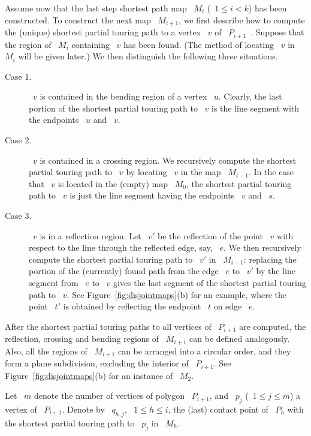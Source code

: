 \documentclass[11pt]{article}
\begin{document}
Assume now that the last step shortest path map ~\(M_i\) (~\(1 \le i < k\)) has been constructed.
To construct the next map ~\(M_{i+1}\), we first describe how to compute the (unique) shortest partial touring path to a vertex ~\(v\) of ~\(P_{i+1}\)~\cite{ref6}.
Suppose that the region of ~\(M_i\) containing ~\(v\) has been found.
(The method of locating ~\(v\) in ~\(M_i\) will be given later.)
We then distinguish the following three situations.

\begin{description}
	\item[Case 1.] ~\(v\) is contained in the bending region of a vertex ~\(u\). Clearly, the last portion of the shortest partial touring path to ~\(v\) is the line segment with the endpoints ~\(u\) and ~\(v\).
	\item[Case 2.] ~\(v\) is contained in a crossing region. We recursively compute the shortest partial touring path to ~\(v\) by locating ~\(v\) in the map ~\(M_{i-1}\). In the case that ~\(v\) is located in the (empty) map ~\(M_0\), the shortest partial touring path to ~\(v\) is just the line segment having the endpoints ~\(v\) and ~\(s\).
	\item[Case 3.] ~\(v\) is in a reflection region. Let ~\(v'\) be the reflection of the point ~\(v\) with respect to the line through the reflected edge, say, ~\(e\). We then recursively compute the shortest partial touring path to ~\(v'\) in ~\(M_{i-1}\): replacing the portion of the (currently) found path from the edge ~\(e\) to ~\(v'\) by the line segment from ~\(e\) to ~\(v\) gives the last segment of the shortest partial touring path to ~\(v\). See Figure~\ref{fig:disjointmaps}(b) for an example, where the point ~\(t'\) is obtained by reflecting the endpoint ~\(t\) on edge ~\(e\).
\end{description}

After the shortest partial touring paths to all vertices of ~\(P_{i+1}\) are computed, the reflection, crossing and bending regions of ~\(M_{i+1}\) can be defined analogously.
Also, all the regions of ~\(M_{i+1}\) can be arranged into a circular order, and they form a plane subdivision, excluding the interior of ~\(P_{i+1}\).
See Figure~\ref{fig:disjointmaps}(b) for an instance of ~\(M_2\).

Let ~\(m\) denote the number of vertices of polygon ~\(P_{i+1}\), and ~\(p_j\) (~\(1 \le j \le m\)) a vertex of ~\(P_{i+1}\).
Denote by ~\(q_{h,j}\), ~\(1 \le h \le i\), the (last) contact point of ~\(P_h\) with the shortest partial touring path to ~\(p_j\) in ~\(M_h\).
\end{document}
